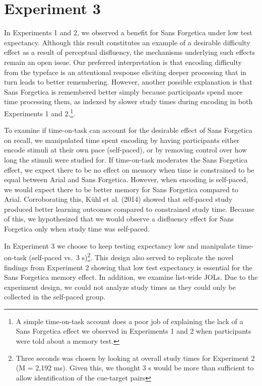 \documentclass[
  english,
  jou]{apa7}
\begin{document}
\hypertarget{experiment-3}{%
\section{Experiment 3}\label{experiment-3}}

In Experiments 1 and 2, we observed a benefit for Sans Forgetica under low test expectancy. Although this result constitutes an example of a desirable difficulty effect as a result of perceptual disfluency, the mechanisms underlying such effects remain an open issue. Our preferred interpretation is that encoding difficulty from the typeface is an attentional response eliciting deeper processing that in turn leads to better remembering. However, another possible explanation is that Sans Forgetica is remembered better simply because participants spend more time processing them, as indexed by slower study times during encoding in both Experiments 1 and 2.\footnote{A simple time-on-task account does a poor job of explaining the lack of a Sans Forgetica effect we observed in Experiments 1 and 2 when participants were told about a memory test.}.

To examine if time-on-task can account for the desirable effect of Sans Forgetica on recall, we manipulated time spent encoding by having participants either encode stimuli at their own pace (self-paced), or by removing control over how long the stimuli were studied for. If time-on-task moderates the Sans Forgetica effect, we expect there to be no effect on memory when time is constrained to be equal between Arial and Sans Forgetica. However, when encoding is self-paced, we would expect there to be better memory for Sans Forgetica compared to Arial. Corroborating this, Kühl et al. (2014) showed that self-paced study produced better learning outcomes compared to constrained study time. Because of this, we hypothesized that we would observe a disfluency effect for Sans Forgetica only when study time was self-paced.

In Experiment 3 we choose to keep testing expectancy low and manipulate time-on-task (self-paced vs.~3 s)\footnote{Three seconds was chosen by looking at overall study times for Experiment 2 (M = 2,192 ms). Given this, we thought 3 s would be more than sufficient to allow identification of the cue-target pairs}. This design also served to replicate the novel findings from Experiment 2 showing that low test expectancy is essential for the Sans Forgetica memory effect. In addition, we examine list-wide JOLs. Due to the experiment design, we could not analyze study times as they could only be collected in the self-paced group.
\end{document}
